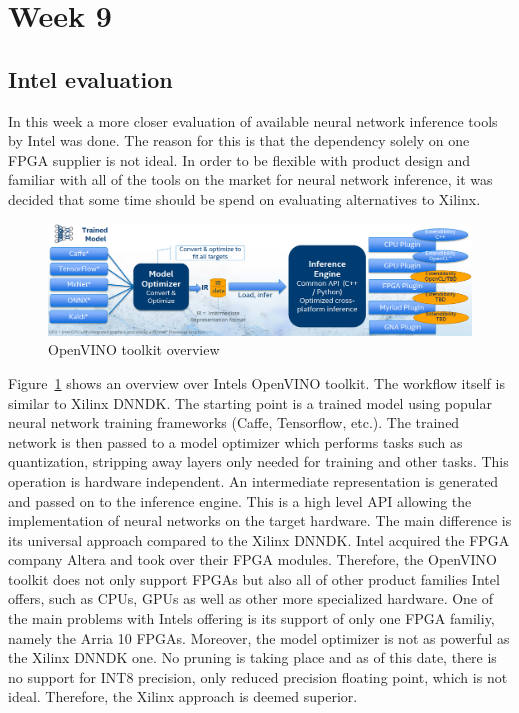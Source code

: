 \section{Week 9}
\subsection{Intel evaluation}
In this week a more closer evaluation of available neural network inference tools by Intel was done. The reason for this is that the dependency solely on one \ac{FPGA} supplier is not ideal. In order to be flexible with product design and familiar with all of the tools on the market for neural network inference, it was decided that some time should be spend on evaluating alternatives to Xilinx.
\begin{figure}[!htb]
	\centering
		\includegraphics[width=\textwidth]{bilder/openVINO-overview.png}
		\caption{OpenVINO toolkit overview~\cite{openvino}}
		\label{fig:openvino}
\end{figure}
Figure~\ref{fig:openvino} shows an overview over Intels OpenVINO toolkit. The workflow itself is similar to Xilinx \ac{DNNDK}. The starting point is a trained model using popular neural network training frameworks (Caffe, Tensorflow, etc.). The trained network is then passed to a model optimizer which performs tasks such as quantization, stripping away layers only needed for training and other tasks. This operation is hardware independent. An intermediate representation is generated and passed on to the inference engine. This is a high level \ac{API} allowing the implementation of neural networks on the target hardware. The main difference is its universal approach compared to the Xilinx \ac{DNNDK}. Intel acquired the \ac{FPGA} company Altera and took over their \ac{FPGA} modules. Therefore, the OpenVINO toolkit does not only support \acp{FPGA} but also all of other product families Intel offers, such as \acp{CPU}, \acp{GPU} as well as other more specialized hardware. One of the main problems with Intels offering is its support of only one \ac{FPGA} familiy, namely the Arria 10 \acp{FPGA}. Moreover, the model optimizer is not as powerful as the Xilinx \ac{DNNDK} one. No pruning is taking place and as of this date, there is no support for INT8 precision, only reduced precision floating point, which is not ideal. Therefore, the Xilinx approach is deemed superior.
